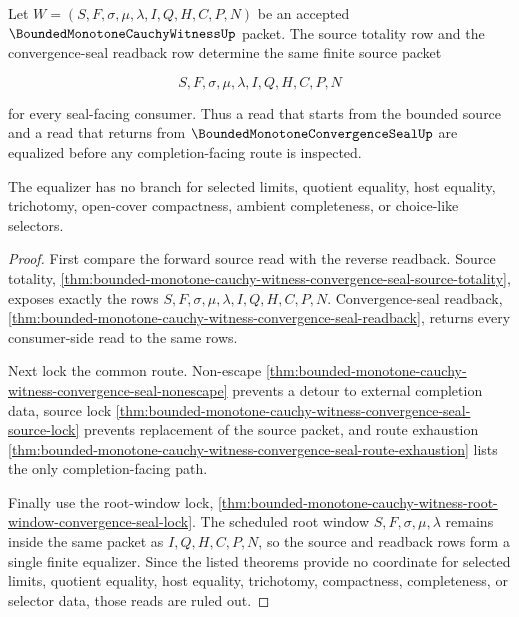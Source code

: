 \begin{theorem}
\label{thm:bounded-monotone-cauchy-witness-source-readback-equalizer}
Let $W=(S,F,\sigma,\mu,\lambda,I,Q,H,C,P,N)$ be an accepted $\BoundedMonotoneCauchyWitnessUp$ packet. The source totality row and the convergence-seal readback row determine the same finite source packet

$$
S,F,\sigma,\mu,\lambda,I,Q,H,C,P,N
$$

for every seal-facing consumer. Thus a read that starts from the bounded source and a read that returns from $\BoundedMonotoneConvergenceSealUp$ are equalized before any completion-facing route is inspected.

The equalizer has no branch for selected limits, quotient equality, host equality, trichotomy, open-cover compactness, ambient completeness, or choice-like selectors.
\end{theorem}
\begin{proof}
First compare the forward source read with the reverse readback. Source totality, \autoref{thm:bounded-monotone-cauchy-witness-convergence-seal-source-totality}, exposes exactly the rows $S,F,\sigma,\mu,\lambda,I,Q,H,C,P,N$. Convergence-seal readback, \autoref{thm:bounded-monotone-cauchy-witness-convergence-seal-readback}, returns every consumer-side read to the same rows.

Next lock the common route. Non-escape \autoref{thm:bounded-monotone-cauchy-witness-convergence-seal-nonescape} prevents a detour to external completion data, source lock \autoref{thm:bounded-monotone-cauchy-witness-convergence-seal-source-lock} prevents replacement of the source packet, and route exhaustion \autoref{thm:bounded-monotone-cauchy-witness-convergence-seal-route-exhaustion} lists the only completion-facing path.

Finally use the root-window lock, \autoref{thm:bounded-monotone-cauchy-witness-root-window-convergence-seal-lock}. The scheduled root window $S,F,\sigma,\mu,\lambda$ remains inside the same packet as $I,Q,H,C,P,N$, so the source and readback rows form a single finite equalizer. Since the listed theorems provide no coordinate for selected limits, quotient equality, host equality, trichotomy, compactness, completeness, or selector data, those reads are ruled out.
\end{proof}


